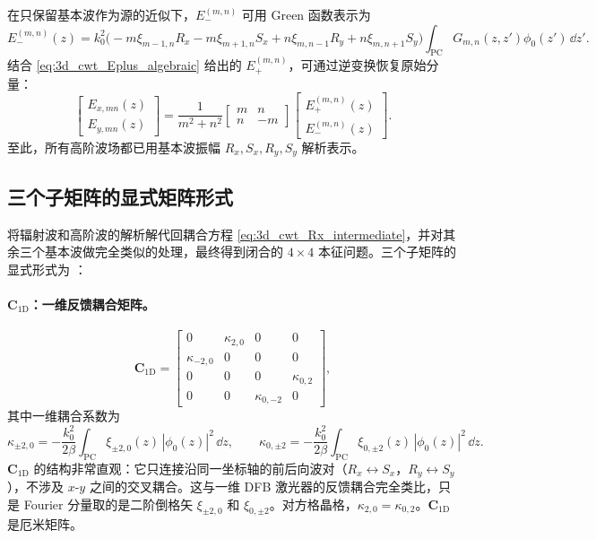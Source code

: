在只保留基本波作为源的近似下，$E_-^{(m,n)}$ 可用 Green 函数表示为
\begin{equation}
E_-^{(m,n)}(z) = k_0^2\bigl(-m\xi_{m-1,n}R_x - m\xi_{m+1,n}S_x + n\xi_{m,n-1}R_y + n\xi_{m,n+1}S_y\bigr)\int_{\mathrm{PC}} G_{m,n}(z,z')\phi_0(z')\,\dd z'.
\label{eq:3d_cwt_Eminus_solution}
\end{equation}
结合 \cref{eq:3d_cwt_Eplus_algebraic} 给出的 $E_+^{(m,n)}$，可通过逆变换恢复原始分量：
\begin{equation}
\begin{bmatrix}
E_{x,mn}(z)\\
E_{y,mn}(z)
\end{bmatrix}
=
\frac{1}{m^2+n^2}
\begin{bmatrix}
m & n\\
n & -m
\end{bmatrix}
\begin{bmatrix}
E_+^{(m,n)}(z)\\
E_-^{(m,n)}(z)
\end{bmatrix}.
\label{eq:3d_cwt_inverse_transform}
\end{equation}
至此，所有高阶波场都已用基本波振幅 $R_x,S_x,R_y,S_y$ 解析表示。

\subsection{三个子矩阵的显式矩阵形式}

将辐射波和高阶波的解析解代回耦合方程 \cref{eq:3d_cwt_Rx_intermediate}，并对其余三个基本波做完全类似的处理，最终得到闭合的 $4\times4$ 本征问题。三个子矩阵的显式形式为 \cite{liang2012square}：

\paragraph{$\bm{C}_{\mathrm{1D}}$：一维反馈耦合矩阵。}
\begin{equation}
\bm{C}_{\mathrm{1D}} =
\begin{bmatrix}
0 & \kappa_{2,0} & 0 & 0\\
\kappa_{-2,0} & 0 & 0 & 0\\
0 & 0 & 0 & \kappa_{0,2}\\
0 & 0 & \kappa_{0,-2} & 0
\end{bmatrix},
\label{eq:3d_cwt_C1D_matrix}
\end{equation}
其中一维耦合系数为
\begin{equation}
\kappa_{\pm2,0} = -\frac{k_0^2}{2\beta}\int_{\mathrm{PC}} \xi_{\pm2,0}(z)\,|\phi_0(z)|^2\,\dd z,
\qquad
\kappa_{0,\pm2} = -\frac{k_0^2}{2\beta}\int_{\mathrm{PC}} \xi_{0,\pm2}(z)\,|\phi_0(z)|^2\,\dd z.
\label{eq:3d_cwt_kappa1D}
\end{equation}
$\bm{C}_{\mathrm{1D}}$ 的结构非常直观：它只连接沿同一坐标轴的前后向波对（$R_x\leftrightarrow S_x$，$R_y\leftrightarrow S_y$），不涉及 $x$-$y$ 之间的交叉耦合。这与一维 DFB 激光器的反馈耦合完全类比，只是 Fourier 分量取的是二阶倒格矢 $\xi_{\pm2,0}$ 和 $\xi_{0,\pm2}$。对方格晶格，$\kappa_{2,0}=\kappa_{0,2}$。$\bm{C}_{\mathrm{1D}}$ 是厄米矩阵。


